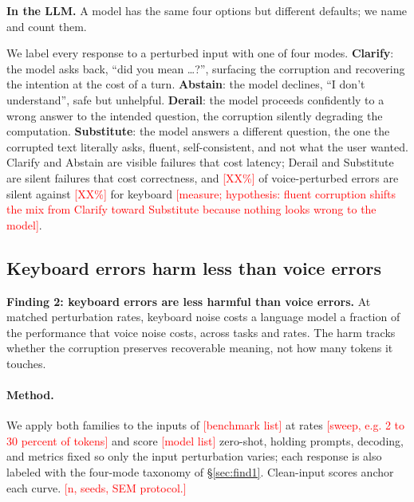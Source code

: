 \documentclass[11pt]{article}
\newcommand{\todo}[1]{\textcolor{red}{[#1]}}
\begin{document}
\begin{modbox}
\textbf{In the LLM.} A model has the same four options but different defaults; we name and count
them.
\end{modbox}

We label every response to a perturbed input with one of four modes.
\textbf{Clarify}: the model asks back, ``did you mean \ldots?'', surfacing the corruption and
recovering the intention at the cost of a turn.
\textbf{Abstain}: the model declines, ``I don't understand'', safe but unhelpful.
\textbf{Derail}: the model proceeds confidently to a wrong answer to the intended question, the
corruption silently degrading the computation.
\textbf{Substitute}: the model answers a different question, the one the corrupted text literally
asks, fluent, self-consistent, and not what the user wanted.
Clarify and Abstain are visible failures that cost latency; Derail and Substitute are silent
failures that cost correctness, and \todo{XX\%} of voice-perturbed errors are silent against
\todo{XX\%} for keyboard \todo{measure; hypothesis: fluent corruption shifts the mix from
Clarify toward Substitute because nothing looks wrong to the model}.

\subsection{Keyboard errors harm less than voice errors}
\label{sec:find2}

\begin{hypbox}
\textbf{Finding 2: keyboard errors are less harmful than voice errors.} At matched perturbation
rates, keyboard noise costs a language model a fraction of the performance that voice noise
costs, across tasks and rates. The harm tracks whether the corruption preserves recoverable
meaning, not how many tokens it touches.
\end{hypbox}


\paragraph{Method.} We apply both families to the inputs of \todo{benchmark list} at rates
\todo{sweep, e.g. 2 to 30 percent of tokens} and score \todo{model list} zero-shot, holding
prompts, decoding, and metrics fixed so only the input perturbation varies; each response is also
labeled with the four-mode taxonomy of \S\ref{sec:find1}. Clean-input scores anchor each curve.
\todo{n, seeds, SEM protocol.}
\end{document}
